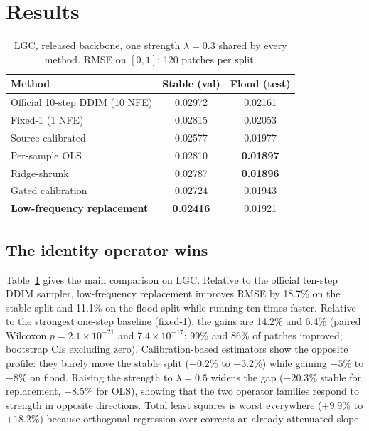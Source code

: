 \documentclass{article}
\begin{document}
\section{Results}
\label{sec:exp}

\begin{table}[t]
\centering
\caption{LGC, released backbone, one strength $\lambda{=}0.3$ shared by every method. RMSE on $[0,1]$; 120 patches per split.}
\label{tab:main}
\begin{tabular}{lcc}
\toprule
Method & Stable (val) & Flood (test) \\
\midrule
Official 10-step DDIM (10 NFE) & 0.02972 & 0.02161 \\
Fixed-1 (1 NFE) & 0.02815 & 0.02053 \\
Source-calibrated & 0.02577 & 0.01977 \\
Per-sample OLS & 0.02810 & \textbf{0.01897} \\
Ridge-shrunk & 0.02787 & \textbf{0.01896} \\
Gated calibration & 0.02724 & 0.01943 \\
\textbf{Low-frequency replacement} & \textbf{0.02416} & 0.01921 \\
\bottomrule
\end{tabular}
\end{table}

\subsection{The identity operator wins}
Table~\ref{tab:main} gives the main comparison on LGC. Relative to the official ten-step DDIM sampler, low-frequency replacement improves RMSE by 18.7\% on the stable split and 11.1\% on the flood split while running ten times faster. Relative to the strongest one-step baseline (fixed-1), the gains are 14.2\% and 6.4\% (paired Wilcoxon $p=2.1\times10^{-21}$ and $7.4\times10^{-17}$; 99\% and 86\% of patches improved; bootstrap CIs excluding zero). Calibration-based estimators show the opposite profile: they barely move the stable split ($-0.2$\% to $-3.2$\%) while gaining $-5$\% to $-8$\% on flood. Raising the strength to $\lambda{=}0.5$ widens the gap ($-20.3$\% stable for replacement, $+8.5$\% for OLS), showing that the two operator families respond to strength in opposite directions. Total least squares is worst everywhere ($+9.9$\% to $+18.2$\%) because orthogonal regression over-corrects an already attenuated slope.
\end{document}
